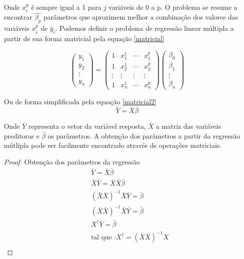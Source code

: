   
  Onde $x^{0}_{i}$ é sempre igual a 1 para $j$ variáveis de 0 a p. O problema se resume a encontrar $\hat{\beta_{p}}$ parâmetros que aproximem melhor a combinação dos valores das variáveis $x^{p}_{i}$ de $\hat{y}_{i}$. Podemos definir o problema de regressão linear múltipla a partir de sua forma matricial pela equação \eqref{matricial}
  
  \begin{equation}\label{matricial}
  \begin{pmatrix}
  y_{1}\\ 
  y_{2}\\
  \vdots\\
  y_{n}
  \end{pmatrix}=\begin{pmatrix}
  1      & x^{1}_{1} & \cdots & x^{p}_{1}\\ 
  1      & x^{1}_{2} & \cdots & x^{p}_{2}\\ 
  \vdots & \vdots    & \vdots & \vdots \\ 
  1      & x^{1}_{n} & \cdots & x^{p}_{n}
  \end{pmatrix}\begin{pmatrix}
  \beta_{0}\\ 
  \beta_{1}\\
  \vdots\\
  \beta_{n}
  \end{pmatrix}
  \end{equation} 
  
  Ou de forma simplificada pela equação \eqref{matricial2}
  \begin{equation}\label{matricial2}
  	\bar{Y} = \bar{X}\bar{\beta}
  \end{equation}
  
  Onde $\bar{Y}$ representa o vetor da variável resposta, $\bar{X}$ a matriz das variáveis preditoras e $\bar{\beta}$ os parâmetros. A obtenção dos parâmetros a partir da regressão mútlipla pode ser facilmente encontrado através de operações matriciais.
  
 \FloatBarrier 
\begin{proof}
	Obtenção dos parâmetros da regressão
	\begin{align*}
	&\bar{Y} = \bar{X}\bar{\beta} \\
	&\bar{X}\bar{Y} = \bar{X}\bar{X}\bar{\beta} \\
	&(\bar{X}\bar{X})^{-1}\bar{X}\bar{Y} = \bar{\beta}\\
	&(\bar{X}\bar{X})^{-1}\bar{X}\bar{Y} = \bar{\beta}\\
	&X^{\dagger}\bar{Y}= \bar{\beta}\\
	&\text{tal que :} X^{\dagger} = (\bar{X}\bar{X})^{-1}X \\ 
	\end{align*}
\end{proof}
\FloatBarrier 
  
